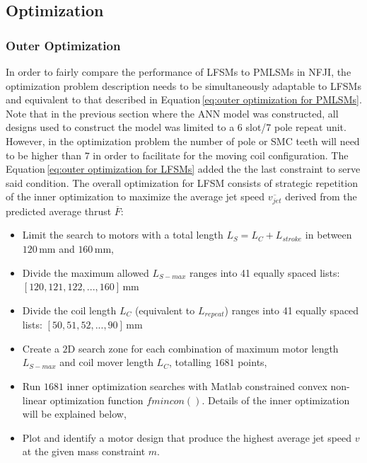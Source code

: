         
        \subsection{Optimization}                   \label{Chapter:RSM/LFSM/Optimization}
        
        
            \subsubsection{Outer Optimization}          \label{Chapter:RSM/LFSM/Optimization/Outer}
            
            
                In order to fairly compare the performance of \acsp{LFSM} to \acsp{PMLSM} in \acs{NFJI}, the optimization problem description needs to be simultaneously adaptable to \acsp{LFSM} and equivalent to that described in Equation\,\ref{eq:outer optimization for PMLSMs}. Note that in the previous section where the \acs{ANN} model was constructed, all designs used to construct the model was limited to a 6 slot/7 pole repeat unit. However, in the optimization problem the number of pole or \acs{SMC} teeth will need to be higher than $7$ in order to facilitate for the moving coil configuration. The Equation\,\ref{eq:outer optimization for LFSMs} added the the last constraint to serve said condition. The overall optimization for \acs{LFSM} consists of strategic repetition of the inner optimization to maximize the average jet speed $\overline{v_{jet}}$ derived from the predicted average thrust $\overline{F}$:
                
                
                \begin{itemize}
                    \item   Limit the search to motors with a total length $L_S = L_{C} + L_{stroke}$ in between $120\,\mathrm{mm}$ and $160\,\mathrm{mm}$,
                    \item   Divide the maximum allowed $L_{S-max}$ ranges into 41 equally spaced lists: \\ $[120, 121, 122, ..., 160]\,\mathrm{mm}$ 
                    \item   Divide the coil length $L_{C}$ (equivalent to $L_{repeat}$) ranges into 41 equally spaced lists:  $[50, 51, 52, ..., 90]\,\mathrm{mm}$ 
                    \item   Create a $\mathrm{2D}$ search zone for each combination of maximum motor length $L_{S-max}$ and coil mover length $L_{C}$, totalling $1681$ points,
                    \item   Run $1681$ inner optimization searches with Matlab constrained convex non-linear optimization function $fmincon()$. Details of the inner optimization will be explained below,
                    \item   Plot and identify a motor design that produce the highest average jet speed $v$ at the given mass constraint $m$.
                \end{itemize}
                
